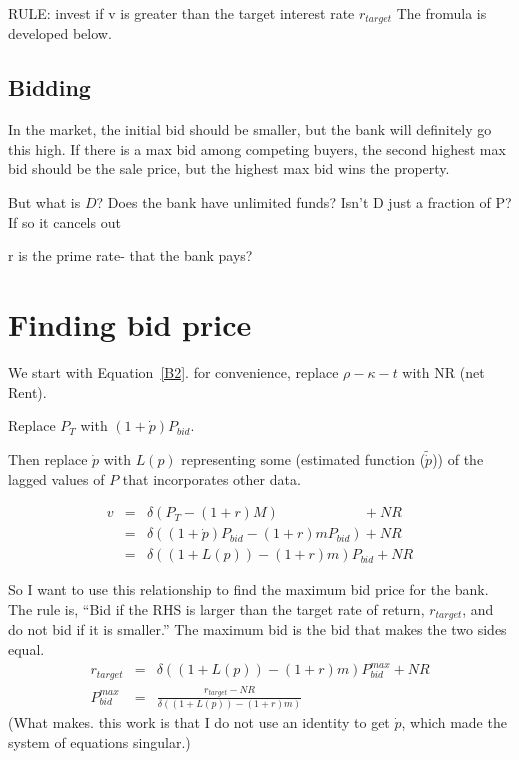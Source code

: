 RULE: invest if v is greater than  the  target interest rate $r_{target}$            The fromula is developed below.

\subsection{Bidding}

In the market, the initial bid should be smaller, but the bank will definitely go this high. If there is a  max bid among competing buyers, the second highest max bid should be the sale price, but the highest max bid wins the property.

But what is $D$? Does the bank have unlimited funds? Isn't D just a fraction of P?  If so it cancels out



r is the prime rate- that the bank pays? 


\section{Finding bid price}
We start with Equation~\ref{B2}. for convenience, replace $\rho   	-\kappa - t $ with NR (net Rent). 

Replace $P_T$ with $(1+\dot p)P_{bid}$.

Then replace   $\dot p$ with $L(p)$ representing some (estimated function ($\tilde{\dot p}$)) of the lagged values of $P$ that incorporates other data. 

\begin{eqnarray}
v&=& \delta(P_T- (1+r)M) \qquad \qquad \qquad 	 + NR \nonumber\\
 &=&\delta\left( (1+\dot p)P_{bid} - (1+r)mP_{bid} \right)  + NR  \nonumber\\
  &=&\delta\left( (1+L(p)) - (1+r)m \right) P_{bid} + NR  \nonumber
\end{eqnarray}


So I want to use this relationship to find the maximum bid price for the bank. The rule is, ``Bid if the RHS is larger than the target rate of return, $r_{target}$, and do not bid if it is smaller.''  The maximum bid  is the bid that makes the two sides equal. 
\begin{eqnarray}
r_{target}&=& \delta\left( (1+L(p)) - (1+r)m \right) P^{max}_{bid} + NR  \nonumber\\
   P^{max}_{bid} &=&\frac{r_{target}-NR}{\delta\left( (1+L(p)) - (1+r)m \right)} \label{EqBidPrice} 
\end{eqnarray}
(What makes. this work is that I do not use an identity to get
$\dot p$, which made the system of equations singular.)
\newpage
